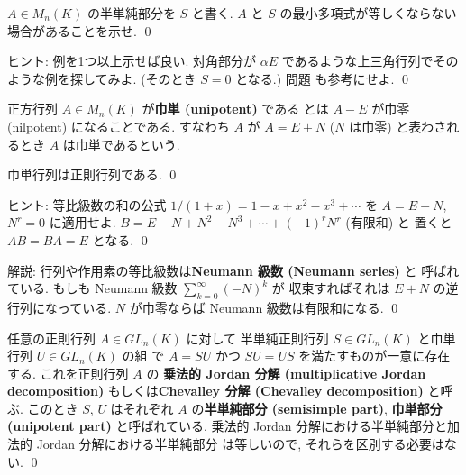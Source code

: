 \documentclass[12pt,twoside]{jarticle}
\begin{document}

\begin{question}
  $A\in M_n(K)$ の半単純部分を $S$ と書く.
  $A$ と $S$ の最小多項式が等しくならない場合があることを示せ.
  \qed
\end{question}

\noindent
ヒント: 例を1つ以上示せば良い.  
対角部分が $\alpha E$ であるような上三角行列でそのような例を探してみよ.
(そのとき $S=0$ となる.)
問題  も参考にせよ.
\qed

\bigskip

正方行列 $A\in M_n(K)$ が{\bf 巾単 (unipotent)} である
とは $A-E$ が巾零 (nilpotent) になることである.
すなわち $A$ が $A=E+N$ ($N$ は巾零) と表わされるとき $A$ は巾単であるという.

\begin{question}
  巾単行列は正則行列である. \qed
\end{question}

\noindent
ヒント: 等比級数の和の公式 $1/(1+x) = 1 - x + x^2 - x^3 + \cdots$ 
を $A=E+N$, $N^r=0$ に適用せよ.  
$B = E - N + N^2 - N^3 + \cdots + (-1)^rN^r$ (有限和) と
置くと $AB = BA = E$ となる.
\qed

\medskip
\noindent
解説: 行列や作用素の等比級数は{\bf Neumann 級数 (Neumann series)} と
呼ばれている. もしも Neumann 級数 $\sum_{k=0}^\infty (-N)^k$ が
収束すればそれは $E+N$ の逆行列になっている.  
$N$ が巾零ならば Neumann 級数は有限和になる.
\qed


\begin{theorem}
\label{theorem:mult-Jordan-decomp}
  任意の正則行列 $A\in GL_n(K)$ に対して
  半単純正則行列 $S\in GL_n(K)$ と巾単行列 $U\in GL_n(K)$ の組
  で $A=SU$ かつ $SU = US$ を満たすものが一意に存在する. 
  これを正則行列 $A$ の
  {\bf 乗法的 Jordan 分解 (multiplicative Jordan decomposition)} 
  もしくは{\bf Chevalley 分解 (Chevalley decomposition)} と呼ぶ.
  このとき $S$, $U$ はそれぞれ $A$ の{\bf 半単純部分 (semisimple part)}, 
  {\bf 巾単部分 (unipotent part)} と呼ばれている.
  乗法的 Jordan 分解における半単純部分と加法的 Jordan 分解における半単純部分
  は等しいので, それらを区別する必要はない.
  \qed  
\end{theorem}
\end{document}
